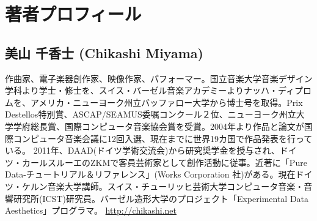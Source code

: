 \documentclass{jsarticle}
\begin{document}
\section{著者プロフィール}
\subsection*{美山 千香士 (Chikashi Miyama)}
作曲家、電子楽器創作家、映像作家、パフォーマー。国立音楽大学音楽デザイン学科より学士・修士を、スイス・バーゼル音楽アカデミーよりナッハ・ディプロムを、アメリカ・ニューヨーク州立バッファロー大学から博士号を取得。Prix Destellos特別賞、ASCAP/SEAMUS委嘱コンクール２位、ニューヨーク州立大学学府総長賞、国際コンピュータ音楽協会賞を受賞。2004年より作品と論文が国際コンピュータ音楽会議に12回入選、現在までに世界19カ国で作品発表を行っている。 2011年、DAAD(ドイツ学術交流会)から研究奨学金を授与され、ドイツ・カールスルーエのZKMで客員芸術家として創作活動に従事。近著に「Pure Data-チュートリアル＆リファレンス」(Works Corporation 社)がある。現在ドイツ・ケルン音楽大学講師。スイス・チューリッヒ芸術大学コンピュータ音楽・音響研究所(ICST)研究員。バーゼル造形大学のプロジェクト「Experimental Data Aesthetics」プログラマ。
\url{http://chikashi.net}
\end{document}
